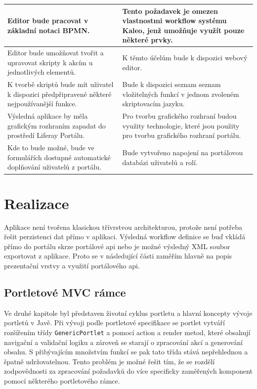 \documentclass{fithesis}
\begin{document}
\begin{center}
\begin{longtable}{|p{5.5cm}|p{5.5cm}|}
\hline Editor bude pracovat v základní notaci BPMN.  & Tento požadavek je omezen vlastnostmi workflow systému Kaleo, jenž umožňuje využít pouze některé prvky. \\
\hline Editor bude umožňovat tvořit a upravovat skripty k akcím u jednotlivých elementů. & K těmto účelům bude k dispozici webový editor. \\
\hline K tvorbě skriptů bude mít uživatel k dispozici předpřipravené některé nejpoužívanější funkce.  &   Bude k dispozici seznam seznam vložitelných funkcí v jednom zvoleném skriptovacím jazyku. \\
\hline Výsledná aplikace by měla grafickým rozhraním zapadat do prostředí Liferay Portálu. & Pro tvorbu grafického rozhraní budou využity technologie, které jsou použity pro tvorbu grafického rozhraní portálu.\\
\hline Kde to bude možné, bude ve formulářích dostupné automatické doplňování uživatelů z portálu. & Bude vytvořeno napojení na portálovou databázi uživatelů a rolí.

\end{longtable}
\end{center}



\chapter{Realizace}
Aplikace není tvořena klasickou třívrstvou architekturou, protože není potřeba řešit perzistenci dat přímo v aplikaci. Výsledná workflow definice se buď vkládá přímo do portálu skrze portálové api nebo je možné výsledný XML soubor exportovat z aplikace. Proto se v následující části zaměřím hlavně na popis prezentační vrstvy a využití portálového api.

\section{Portletové MVC rámce}
Ve druhé kapitole byl představen životní cyklus portletu a hlavní koncepty vývoje portletů v Javě. Při vývoji podle portletové specifikace se portlet vytváří rozšířením třídy  \verb|GenericPortlet| a pomocí action a render metod, které obsahují navigační a validační logiku a zároveň se starají o zpracování akcí a generování obsahu. S přibývajícím množstvím funkcí se pak tato třída stává nepřehlednou a špatně udržovatelnou. Tento problém je možné řešit tím, že se rozdělí zodpovědnosti za zpracování požadavků do více specificky zaměřených komponent pomocí některého portletového rámce.
\end{document}
